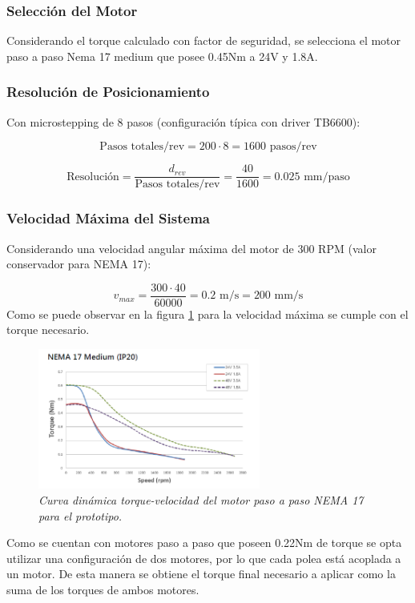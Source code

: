 \subsubsection{Selección del Motor}

Considerando el torque calculado con factor de seguridad, se selecciona el motor paso a paso Nema 17 medium que posee  0.45Nm a 24V y 1.8A. 

\subsubsection{Resolución de Posicionamiento}

Con microstepping de 8 pasos (configuración típica con driver TB6600):

\begin{equation}
    \text{Pasos totales/rev} = 200 \cdot 8 = 1600 \text{ pasos/rev}
\end{equation}

\begin{equation}
    \text{Resolución} = \frac{d_{rev}}{\text{Pasos totales/rev}} = \frac{40}{1600} = 0.025 \text{ mm/paso}
\end{equation}

\subsubsection{Velocidad Máxima del Sistema}

Considerando una velocidad angular máxima del motor de 300 RPM (valor conservador para NEMA 17):

\begin{equation}
    v_{max} = \frac{300 \cdot 40}{60000} = 0.2 \text{ m/s} = 200 \text{ mm/s}
\end{equation}
Como se puede observar en la figura \ref{fig:Curva_din_nema17medium} para la velocidad máxima se cumple con el torque necesario.
\begin{figure}[H]
    \centering
    \includegraphics[width=0.65\textwidth]{img/nema17_medium.png}
    \caption{\textit{Curva dinámica torque-velocidad del motor paso a paso NEMA 17 para el prototipo.}}
    \label{fig:Curva_din_nema17medium}
\end{figure}
Como se cuentan con motores paso a paso que poseen 0.22Nm de torque se opta utilizar una configuración de dos motores, por lo que cada polea está acoplada a un motor. De esta manera se obtiene el torque final necesario a aplicar como la suma de los torques de ambos motores.